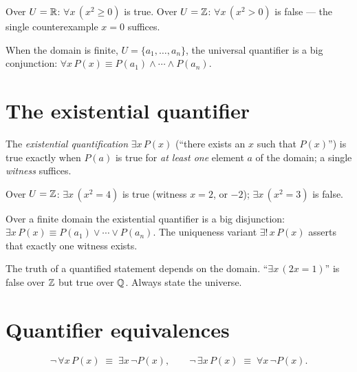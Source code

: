 \begin{example}
Over $U = \mathbb{R}$: $\forall x\, (x^2 \geq 0)$ is true. Over $U = \mathbb{Z}$:
$\forall x\, (x^2 > 0)$ is false --- the single counterexample $x = 0$
suffices.
\end{example}

\begin{notebox}
When the domain is finite, $U = \{a_1, \dots, a_n\}$, the universal
quantifier is a big conjunction:
$\forall x\,P(x) \equiv P(a_1) \wedge \cdots \wedge P(a_n)$.
\end{notebox}

\section{The existential quantifier}

\begin{definition}
The \emph{existential quantification} $\exists x\, P(x)$ (``there exists an
$x$ such that $P(x)$'') is true exactly when $P(a)$ is true for \emph{at least
one} element $a$ of the domain; a single \emph{witness} suffices.
\end{definition}

\begin{example}
Over $U = \mathbb{Z}$: $\exists x\,(x^2 = 4)$ is true (witness $x = 2$, or $-2$);
$\exists x\,(x^2 = 3)$ is false.
\end{example}

Over a finite domain the existential quantifier is a big disjunction:
$\exists x\,P(x) \equiv P(a_1) \vee \cdots \vee P(a_n)$. The uniqueness
variant $\exists!\,x\,P(x)$ asserts that exactly one witness exists.

\begin{notebox}
The truth of a quantified statement depends on the domain. ``$\exists x\,
(2x = 1)$'' is false over $\mathbb{Z}$ but true over $\mathbb{Q}$. Always state the universe.
\end{notebox}

\section{Quantifier equivalences}

\begin{theorem}\label{thm:qdm}
\[
\neg\,\forall x\, P(x) \;\equiv\; \exists x\, \neg P(x),
\qquad
\neg\,\exists x\, P(x) \;\equiv\; \forall x\, \neg P(x).
\]
\end{theorem}

